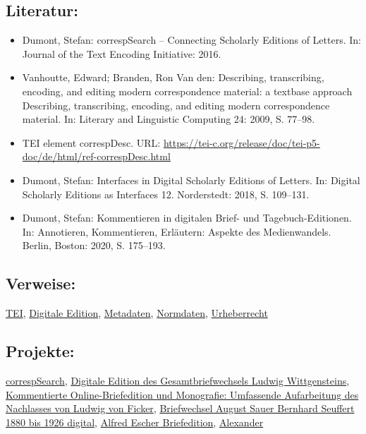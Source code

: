 \documentclass{article}
\begin{document}
        \subsection*{Literatur:}\begin{itemize}\item Dumont, Stefan: correspSearch – Connecting Scholarly Editions of
                              Letters. In: Journal of the Text Encoding Initiative: 2016.\item Vanhoutte, Edward; Branden, Ron Van den: Describing, transcribing, encoding, and editing modern
                              correspondence material: a textbase approach Describing, transcribing, encoding, and editing
                              modern correspondence material. In: Literary and Linguistic Computing 24: 2009, S. 77–98.\item TEI element correspDesc. URL: \url{https://tei-c.org/release/doc/tei-p5-doc/de/html/ref-correspDesc.html}\item Dumont, Stefan: Interfaces in Digital Scholarly Editions of
                              Letters. In: Digital Scholarly Editions as Interfaces 12. Norderstedt: 2018, S. 109–131.\item Dumont, Stefan: Kommentieren in digitalen Brief- und
                              Tagebuch-Editionen. In: Annotieren, Kommentieren, Erläutern: Aspekte des
                              Medienwandels. Berlin, Boston: 2020, S. 175–193.\end{itemize}\subsection*{Verweise:}\href{https://gams.uni-graz.at/o:konde.178}{TEI}, \href{https://gams.uni-graz.at/o:konde.59}{Digitale Edition}, \href{https://gams.uni-graz.at/o:konde.25}{Metadaten}, \href{https://gams.uni-graz.at/o:konde.147}{Normdaten}, \href{https://gams.uni-graz.at/o:konde.44}{Urheberrecht}\subsection*{Projekte:}\href{https://correspsearch.net}{correspSearch}, \href{https://www.uibk.ac.at/brenner-archiv/projekte/wittg_briefe/}{Digitale Edition des Gesamtbriefwechsels Ludwig Wittgensteins}, \href{https://www.uibk.ac.at/brenner-archiv/projekte/ficker_briefed/}{Kommentierte Online-Briefedition und Monografie: Umfassende Aufarbeitung
                           des Nachlasses von Ludwig von Ficker}, \href{https://edition.onb.ac.at/sauer-seuffert}{Briefwechsel August Sauer Bernhard Seuffert 1880 bis 1926 digital}, \href{https://www.briefedition.alfred-escher.ch}{Alfred Escher Briefedition}, \href{https://hdl.handle.net/11471/925.20}{Alexander
}
\end{document}
